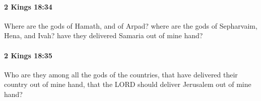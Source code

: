 		\paragraph{2 Kings 18:34} %
			\label{2KINGS-18-34}

			Where are the gods of Hamath, and of Arpad? where are the gods of Sepharvaim, Hena, and Ivah? have they delivered Samaria out of mine hand?


		\paragraph{2 Kings 18:35} %
			\label{2KINGS-18-35}

			Who are they among all the gods of the countries, that have delivered their country out of mine hand, that the LORD should deliver Jerusalem out of mine hand?


